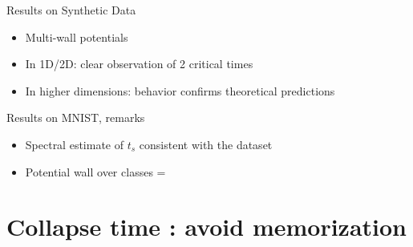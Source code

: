 \documentclass[aspectratio=169]{beamer}
\begin{document}
\begin{frame}{Results on Synthetic Data}
    \begin{itemize}
        \item Multi-wall potentials
        \item In 1D/2D: clear observation of 2 critical times
        \item In higher dimensions: behavior confirms theoretical predictions
    \end{itemize}
    
    \begin{center}
    \end{center}
\end{frame}


\begin{frame}{Results on MNIST, remarks}
    \begin{itemize}
        \item Spectral estimate of $t_s$ consistent with the dataset
        \item Potential wall over classes = 
    \end{itemize}

    
    
    \begin{center}
    \end{center}
\end{frame}















\section{Collapse time : avoid memorization}
\end{document}
